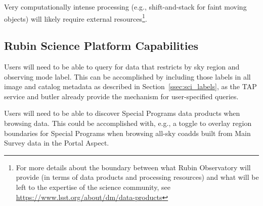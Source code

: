 Very computationally intense processing (e.g., shift-and-stack for faint moving 
objects) will likely require external resources\footnote{For more details about 
the boundary between what Rubin Observatory will provide (in terms of data products 
and processing resources) and what will be left to the expertise of the science community, 
see \url{https://www.lsst.org/about/dm/data-products}}.

\subsection{Rubin Science Platform Capabilities}\label{ssec:sci_rsp}

Users will need to be able to query for data that restricts by sky region and 
observing mode label. 
This can be accomplished by including those labels in all image and catalog 
metadata as described in Section~\ref{ssec:sci_labels}, as the TAP service 
and butler already provide the mechanism for user-specified queries.

Users will need to be able to discover Special Programs data products when 
browsing data.
This could be accomplished with, e.g., a toggle to overlay region boundaries
for Special Programs when browsing all-sky coadds built from Main Survey data
in the Portal Aspect.


